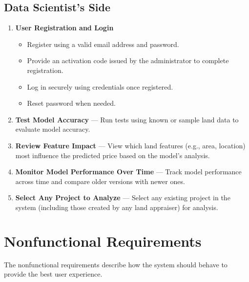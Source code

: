 \documentclass[12pt,oneside]{report}
\begin{document}
\subsection{Data Scientist's Side}
\begin{enumerate}[leftmargin=*,label=\arabic*.,align=left]
  \item \textbf{User Registration and Login}
  \begin{itemize}[leftmargin=1.2em]
    \item Register using a valid email address and password.
    \item Provide an activation code issued by the administrator to complete registration.
    \item Log in securely using credentials once registered.
    \item Reset password when needed.
  \end{itemize}

  \item \textbf{Test Model Accuracy} — Run tests using known or sample land data to evaluate model accuracy.

  \item \textbf{Review Feature Impact} — View which land features (e.g., area, location) most influence the predicted price based on the model’s analysis.

  \item \textbf{Monitor Model Performance Over Time} — Track model performance across time and compare older versions with newer ones.

  \item \textbf{Select Any Project to Analyze} — Select any existing project in the system (including those created by any land appraiser) for analysis.
\end{enumerate}

\section{Nonfunctional Requirements}
The nonfunctional requirements describe how the system should behave to provide the best user experience.
\end{document}
